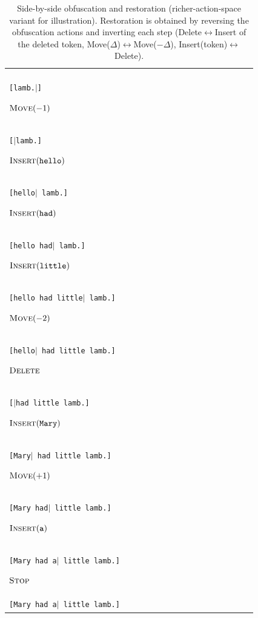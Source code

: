 \documentclass[11pt]{article}
\DeclareRobustCommand{\Stop}{\ifmmode\text{\textsc{Stop}}\else\textsc{Stop}\fi}
\DeclareRobustCommand{\Insert}{\ifmmode\text{\textsc{Insert}}\else\textsc{Insert}\fi}
\DeclareRobustCommand{\Move}{\ifmmode\text{\textsc{Move}}\else\textsc{Move}\fi}
\DeclareRobustCommand{\Delete}{\ifmmode\text{\textsc{Delete}}\else\textsc{Delete}\fi}
\begin{document}
\begin{table}[tbp]
\begin{tabular}{p{0.48\linewidth} p{0.48\linewidth}}
\begin{minipage}[t]{\linewidth}
\begin{enumerate}[leftmargin=*,itemsep=0.2em]
\item $\Insert(\texttt{lamb.})$\\
\texttt{[lamb.$\mid$]}

\item $\Move(-1)$\\
\texttt{[$\mid$lamb.]}

\item $\Insert(\texttt{hello})$\\
\texttt{[hello$\mid$ lamb.]}

\item $\Insert(\texttt{had})$\\
\texttt{[hello had$\mid$ lamb.]}

\item $\Insert(\texttt{little})$\\
\texttt{[hello had little$\mid$ lamb.]}

\item $\Move(-2)$\\
\texttt{[hello$\mid$ had little lamb.]}

\item $\Delete$\\
\texttt{[$\mid$had little lamb.]}

\item $\Insert(\texttt{Mary})$\\
\texttt{[Mary$\mid$ had little lamb.]}

\item $\Move(+1)$\\
\texttt{[Mary had$\mid$ little lamb.]}

\item $\Insert(\texttt{a})$\\
\texttt{[Mary had a$\mid$ little lamb.]}

\item $\Stop$\\
\texttt{[Mary had a$\mid$ little lamb.]}
\end{enumerate}
\end{minipage}
\\

\bottomrule
\end{tabular}
\caption{Side-by-side obfuscation and restoration (richer-action-space variant for illustration). Restoration is obtained by reversing the obfuscation actions and inverting each step (Delete$\leftrightarrow$Insert of the deleted token, Move($\Delta$)$\leftrightarrow$Move($-\Delta$), Insert(token)$\leftrightarrow$Delete).}
\label{tab:obf_restore_side_by_side}
\end{table}
\end{document}
